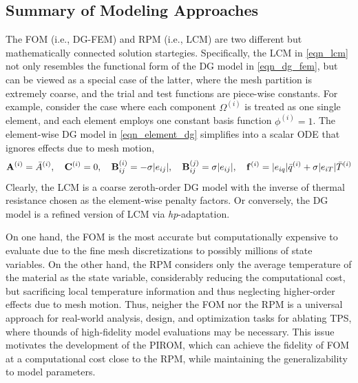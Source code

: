 \subsection{Summary of Modeling Approaches}

The FOM (i.e., DG-FEM) and RPM (i.e., LCM) are two different but mathematically connected solution startegies. Specifically, the LCM in \cref{eqn_lcm} not only resembles the functional form of the DG model in \cref{eqn_dg_fem}, but can be viewed as a special case of the latter, where the mesh partition is extremely coarse, and the trial and test functions are piece-wise constants. For example, consider the case where each component $\Omega^{(i)}$ is treated as one single element, and each element employs one constant basis function $\phi^{(i)}=1$. The element-wise DG model in \cref{eqn_element_dg} simplifies into a scalar ODE that ignores effects due to mesh motion,
\begin{equation}
    \mathbf{A}^{(i)} = \bar{A}^{(i)},\quad \mathbf{C}^{(i)} = 0, \quad\mathbf{B}^{(i)}_{ij} = -\sigma|e_{ij}|,\quad \mathbf{B}^{(j)}_{ij}=\sigma|e_{ij}|,\quad \mathbf{f}^{(i)} = |e_{iq}|\bar{q}^{(i)} + \sigma|e_{iT}|\bar{T}^{(i)}
\end{equation}
Clearly, the LCM is a coarse zeroth-order DG model with the inverse of thermal resistance chosen as the element-wise penalty factors. Or conversely, the DG model is a refined version of LCM via \textit{hp}-adaptation.

On one hand, the FOM is the most accurate but computationally expensive to evaluate due to the fine mesh discretizations to possibly millions of state variables. On the other hand, the RPM considers only the average temperature of the material as the state variable, considerably reducing the computational cost, but sacrificing local temperature information and thus neglecting higher-order effects due to mesh motion. Thus, neigher the FOM nor the RPM is a universal approach for real-world analysis, design, and optimization tasks for ablating TPS, where thounds of high-fidelity model evaluations may be necessary. This issue motivates the development of the PIROM, which can achieve the fidelity of FOM at a computational cost close to the RPM, while maintaining the generalizability to model parameters.
